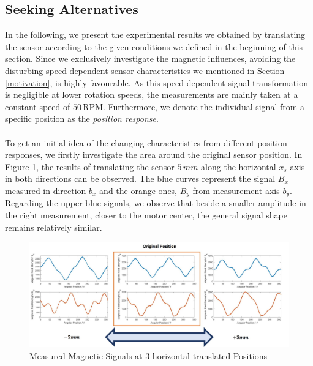 \documentclass[english]{isasthesis}
\begin{document}
    		\subsection{Seeking Alternatives} \label{alternatives}
    		In the following, we present the experimental results we obtained by translating the sensor according to the given conditions we defined in the beginning of this section. Since we exclusively investigate the magnetic influences, avoiding the disturbing speed dependent sensor characteristics we mentioned in Section \ref{motivation}, is highly favourable. As this speed dependent signal transformation is negligible at lower rotation speeds, the measurements are mainly taken at a constant speed of $50\,$RPM. Furthermore, we denote the individual signal from a specific position as the \textit{position response}. \\ \\
    		To get an initial idea of the changing characteristics from different position responses, we firstly investigate the area around the original sensor position. In Figure \ref{fig:position original translated}, the results of translating the sensor $5\,mm$ along the horizontal $x_s$ axis in both directions can be observed. The blue curves represent the signal $B_x$ measured in direction $b_x$ and the orange ones, $B_y$ from measurement axis $b_y$.  Regarding the upper blue signals, we observe that beside a smaller amplitude in the right measurement, closer to the motor center, the general signal shape remains relatively similar.
    		\begin{figure}[t]
    		\begin{center}
    			\includegraphics[width=1\textwidth]{figures/Positions/original_translated_1.jpg}   
  			\end{center}
    		\caption{Measured Magnetic Signals at 3 horizontal translated Positions}
    		\label{fig:position original translated}
    		\end{figure}
	
\end{document}
